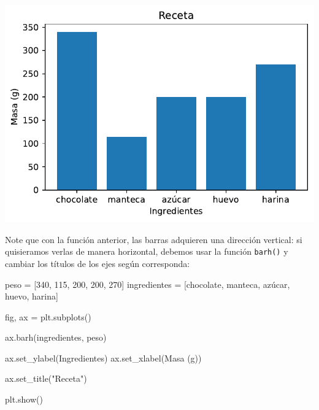 \documentclass[
  letterpaper,
  DIV=11,
  numbers=noendperiod]{scrreprt}
\newenvironment{Shaded}{\begin{snugshade}}{\end{snugshade}}
\newcommand{\DecValTok}[1]{\textcolor[rgb]{0.68,0.00,0.00}{#1}}
\newcommand{\NormalTok}[1]{\textcolor[rgb]{0.00,0.23,0.31}{#1}}
\newcommand{\OperatorTok}[1]{\textcolor[rgb]{0.37,0.37,0.37}{#1}}
\newcommand{\StringTok}[1]{\textcolor[rgb]{0.13,0.47,0.30}{#1}}
\begin{document}
\includegraphics{unidad_6_files/figure-pdf/cell-119-output-1.pdf}

Note que con la función anterior, las barras adquieren una dirección
vertical: si quisieramos verlas de manera horizontal, debemos usar la
función \texttt{barh()} y cambiar los títulos de los ejes según
corresponda:

\begin{Shaded}
\begin{Highlighting}[]
\NormalTok{peso }\OperatorTok{=}\NormalTok{ [}\DecValTok{340}\NormalTok{, }\DecValTok{115}\NormalTok{, }\DecValTok{200}\NormalTok{, }\DecValTok{200}\NormalTok{, }\DecValTok{270}\NormalTok{]}
\NormalTok{ingredientes }\OperatorTok{=}\NormalTok{ [}\StringTok{\textquotesingle{}chocolate\textquotesingle{}}\NormalTok{, }\StringTok{\textquotesingle{}manteca\textquotesingle{}}\NormalTok{, }\StringTok{\textquotesingle{}azúcar\textquotesingle{}}\NormalTok{, }\StringTok{\textquotesingle{}huevo\textquotesingle{}}\NormalTok{, }\StringTok{\textquotesingle{}harina\textquotesingle{}}\NormalTok{]}

\NormalTok{fig, ax }\OperatorTok{=}\NormalTok{ plt.subplots()}

\NormalTok{ax.barh(ingredientes, peso)}

\NormalTok{ax.set\_ylabel(}\StringTok{\textquotesingle{}Ingredientes\textquotesingle{}}\NormalTok{)}
\NormalTok{ax.set\_xlabel(}\StringTok{\textquotesingle{}Masa (g)\textquotesingle{}}\NormalTok{)}

\NormalTok{ax.set\_title(}\StringTok{"Receta"}\NormalTok{)}

\NormalTok{plt.show()}
\end{Highlighting}
\end{Shaded}
\end{document}
